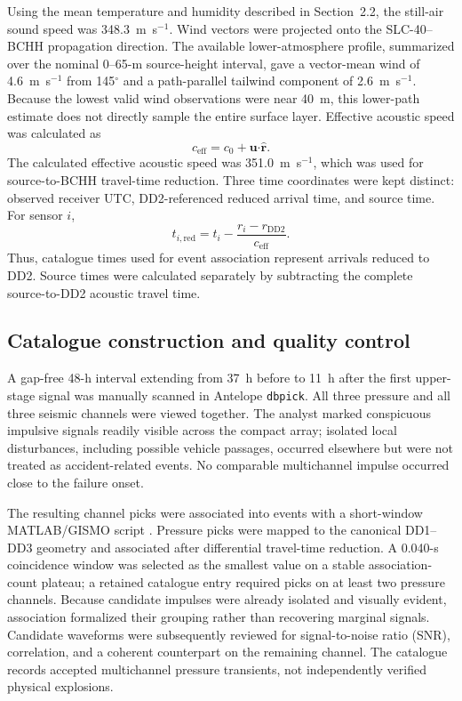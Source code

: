 \documentclass[]{seismica}
\begin{document}
Using the mean temperature and humidity described in Section~2.2, the
still-air sound speed was 348.3~m~s$^{-1}$. Wind vectors were projected onto
the SLC-40--BCHH propagation direction. The available lower-atmosphere profile,
summarized over the nominal 0--65-m source-height interval, gave a vector-mean
wind of 4.6~m~s$^{-1}$ from 145$^\circ$ and a path-parallel tailwind component
of 2.6~m~s$^{-1}$. Because the lowest valid wind observations were near 40~m,
this lower-path estimate does not directly sample the entire surface layer.
Effective acoustic speed was calculated as
\begin{equation}
 c_{\mathrm{eff}}=c_0+\mathbf{u}\boldsymbol{\cdot}\hat{\mathbf{r}}.
 \label{eq:effective_speed}
\end{equation}
The calculated effective acoustic speed was 351.0~m~s$^{-1}$, which was used
for source-to-BCHH travel-time reduction.
Three time coordinates were kept distinct: observed
receiver UTC, DD2-referenced reduced arrival time, and source time. For sensor
$i$,
\begin{equation}
 t_{i,\mathrm{red}}=t_i-\frac{r_i-r_{\mathrm{DD2}}}{c_{\mathrm{eff}}}.
 \label{eq:reduced_time}
\end{equation}
Thus, catalogue times used for event association represent arrivals reduced
to DD2. Source times were calculated separately by subtracting the complete
source-to-DD2 acoustic travel time.

\subsection{Catalogue construction and quality control}

A gap-free 48-h interval extending from 37~h before to 11~h after the first
upper-stage signal was manually scanned in Antelope \texttt{dbpick}. All three
pressure and all three seismic channels were viewed together. The analyst
marked conspicuous impulsive signals readily visible across the compact array;
isolated local disturbances, including possible vehicle passages, occurred
elsewhere but were not treated as accident-related events. No comparable
multichannel impulse occurred close to the failure onset.

The resulting channel picks were associated into events with a short-window
MATLAB/GISMO script \citep{brtt_antelope,thompson_gismo_2017}. Pressure picks
were mapped to the canonical DD1--DD3
geometry and associated after differential travel-time reduction. A 0.040-s
coincidence window was selected as the smallest value on a stable
association-count plateau; a retained catalogue entry required picks on at
least two pressure channels. Because candidate impulses were already isolated
and visually evident, association formalized their grouping rather than
recovering marginal signals. Candidate waveforms were subsequently reviewed
for signal-to-noise ratio (SNR), correlation, and a coherent counterpart on the
remaining channel. The catalogue records accepted multichannel pressure
transients, not independently verified physical explosions.
\end{document}

